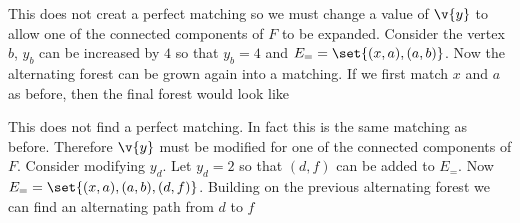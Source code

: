 \documentclass[11pt, oneside]{article}
\begin{document}
\begin{enumerate}
\begin{enumerate}
\begin{center}
        \end{center}
        This does not creat a perfect matching so we must change a value of
        $\v{y}$ to allow one of the connected components of $F$ to be expanded.
        Consider the vertex $b$, $y_b$ can be increased by $4$ so that $y_b=4$
        and $E_{=} = \set{(x, a), (a, b)}$.
        Now the alternating forest can be grown again into a matching.
        If we first match $x$ and $a$ as before, then the final forest would
        look like
        \begin{center}
        \end{center}
        This does not find a perfect matching. 
        In fact this is the same matching as before.
        Therefore $\v{y}$ must be modified for one of the connected components of $F$.
        Consider modifying $y_d$.
        Let $y_d = 2$ so that $(d, f)$ can be added to $E_{=}$.
        Now $E_{=} = \set{(x, a), (a, b), (d, f)}$.
        Building on the previous alternating forest we can find an alternating
        path from $d$ to $f$
        \begin{center}
\end{center}
\end{enumerate}
\end{enumerate}
\end{document}
